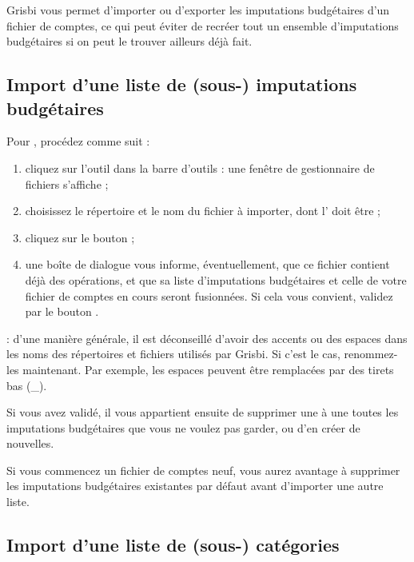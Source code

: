 Grisbi vous permet d'importer ou d'exporter les imputations budgétaires d'un fichier de comptes, ce qui peut éviter de recréer tout un ensemble d'imputations budgétaires si on peut le trouver ailleurs déjà fait.


\subsection{Import d'une liste de (sous-) imputations budgétaires\label{budgetarylines-importexport-import} }

Pour , procédez comme suit :

\begin{enumerate}
	 \item cliquez sur l'outil  dans la barre d'outils : une fenêtre de gestionnaire de fichiers s'affiche ;
	 \item choisissez le répertoire et le nom du fichier à importer, dont l' doit être  ;
	 \item cliquez sur le bouton  ; 
	 \item une boîte de dialogue vous informe, éventuellement, que ce fichier contient déjà des opérations, et que sa liste d'imputations budgétaires et celle de votre fichier de comptes en cours seront fusionnées. Si cela vous convient, validez par le bouton .
\end{enumerate}

 : d'une manière générale, il est déconseillé d'avoir des accents ou des espaces dans les noms des répertoires et fichiers utilisés par Grisbi. Si c'est le cas, renommez-les maintenant. Par exemple, les espaces peuvent être remplacées par des tirets bas (\_). 

Si vous avez validé, il vous appartient ensuite de supprimer une à une toutes les imputations budgétaires que vous ne voulez pas garder, ou d'en créer de nouvelles.

Si vous commencez un fichier de comptes neuf, vous aurez avantage à supprimer les imputations budgétaires existantes par défaut avant d'importer une autre liste.


\subsection{Import d'une liste de (sous-) catégories\label{budgetarylines-importexport-importCategories} }

